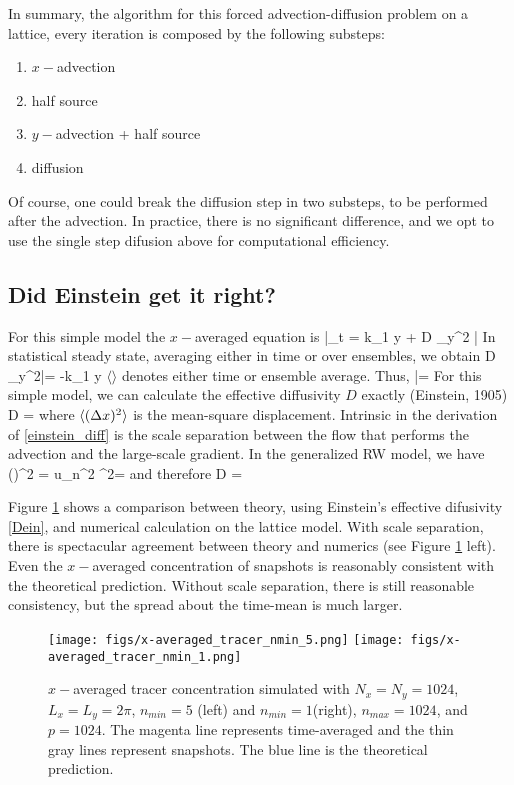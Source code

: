 \documentclass[11pt]{article}
\newcommand{\bvth}{\bar{\vth}}
\begin{document}
In summary, the algorithm for this forced advection-diffusion problem on a lattice, every iteration is
composed by the following substeps:
\begin{enumerate}
    \item $x-$advection
    \item half source
    \item $y-$advection + half source
    \item diffusion
\end{enumerate}
Of course, one could break the diffusion step in two substeps, to be performed after the advection.
In practice, there is no significant difference, and we opt to use the single step difusion above
for computational efficiency. 




\subsection{Did Einstein get it right?}
For this simple model the $x-$averaged equation is
\beq
\label{xave_cos}
\bvth_t   = \cos k_1 y + D \p_y^2 \bvth\com
\eeq
In statistical steady state, averaging either in time or over ensembles, we obtain
\beq
D \p_y^2\langle \bvth\rangle = -\cos k_1 y\com
\eeq
$\langle\rangle$ denotes either time or ensemble average. Thus,
\beq
\langle \bvth \rangle = \per
\eeq
For this simple model, we can calculate the effective diffusivity $D$ exactly (Einstein, 1905)
\beq
\label{einstein_diff}
D = \frac{\langle (\dx)^2 \rangle}{2 \tau}\com
\eeq
where $\langle (\Delta x)^2 \rangle$ is the mean-square displacement. Intrinsic in the derivation of
\eqref{einstein_diff} is the scale separation between the flow that performs the  advection
and the large-scale gradient. In the generalized RW model, we have
\beq
\langle (\dx)^2 \rangle = \langle u_n^2 \tau^2\rangle = \com
\eeq
and therefore
\beq
\label{Dein}
D = \per
\eeq

Figure \ref{p35} shows a comparison between theory, using Einstein's effective difusivity
\eqref{Dein}, and numerical calculation on the lattice model. With scale separation, there
is spectacular agreement between theory and numerics (see Figure \ref{p35} left). Even
the $x-$averaged concentration of snapshots is reasonably consistent with the theoretical prediction.
Without scale separation, there is still reasonable consistency, but the spread about the time-mean
is much larger.

\begin{figure}[ht]
    \label{p35}
    \centering
    \texttt{[image: figs/x-averaged\_tracer\_nmin\_5.png]}
    \texttt{[image: figs/x-averaged\_tracer\_nmin\_1.png]}
    \caption{$x-$averaged tracer concentration simulated with $N_x = N_y = 1024$, $L_x = L_y = 2 \pi$, 
        $n_{min}=5$ (left) and $n_{min}=1$(right), $n_{max}=1024$, and $p=1024$. The magenta line represents time-averaged 
            and the thin gray lines represent snapshots. The blue line is the theoretical prediction.}
\end{figure}
\end{document}
